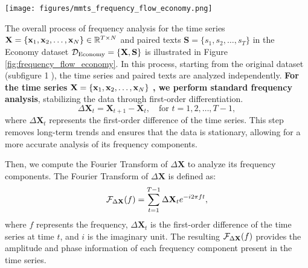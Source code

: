 \begin{figure*}[t]
    \centering
    \texttt{[image: figures/mmts\_frequency\_flow\_economy.png]}
    \caption{Illustration of the frequency analysis process for time series with paired texts in the Economy dataset. Step \textcircled{1}: Compute the average text similarity for each lag $k$. Step \textcircled{2}: Stabilize the time series using first-order differentiation, apply Fourier Transform, and perform Non-Maximum Suppression (NMS) to obtain the amplitude spectrum. Step \textcircled{3}: Visualize the lag similarity of paired texts. Step \textcircled{4}: Stabilize the paired texts, compute the Fourier Transform, and visualize the amplitude spectrum. Step \textcircled{5}: Overlay the top-$l$ (here $l$=4) frequencies of paired texts onto the time series amplitude spectrum to highlight shared periodic patterns. All the data transformation operations in this process are periodicity-preserving according to Proposition \ref{proposition: lag similarity} and Proposition \ref{proposition: first-order differentiation}.}
    \label{fig:frequency_flow_economy}
\end{figure*}



The overall process of frequency analysis for the time series $\mathbf{X} = \{\mathbf{x}_1, \mathbf{x}_2, \dots, \mathbf{x}_N \} \in \mathbb{R}^{T \times N}$ and paired texts $\bm{S} = \{s_1, s_2, \dots, s_T\}$ in the Economy dataset $\mathcal{D}_{\text{Economy}} = \{\mathbf{X}, \mathbf{S}\}$ is illustrated in Figure \ref{fig:frequency_flow_economy}. In this process, starting from the original dataset (subfigure \textcircled{1}), the time series and paired texts are analyzed independently. \textbf{For the time series} $\mathbf{X} = \{\mathbf{x}_1, \mathbf{x}_2, \dots, \mathbf{x}_N \}$ \textbf{, we perform standard frequency analysis}, stabilizing the data through first-order differentiation.
\begin{equation}
\Delta \bm{X}_t = \bm{X}_{t+1} - \bm{X}_t, \quad \text{for } t = 1, 2, \dots, T-1,
\end{equation}
where $\Delta \bm{X}_t$ represents the first-order difference of the time series. This step removes long-term trends and ensures that the data is stationary, allowing for a more accurate analysis of its frequency components.

Then, we compute the Fourier Transform \cite{nussbaumer1982fast, sneddon1995fourier} of $\Delta\bm{X}$ to analyze its frequency components. The Fourier Transform of $\Delta\bm{X}$ is defined as:
\begin{equation}
\mathcal{F}_{\Delta\mathbf{X}}(f) = \sum_{t=1}^{T-1} \Delta\mathbf{X}_t e^{-i 2 \pi f t},
\end{equation}
where $f$ represents the frequency, $\Delta\bm{X}_t$ is the first-order difference of the time series at time $t$, and $i$ is the imaginary unit. The resulting $\mathcal{F}_{\Delta\mathbf{X}}(f)$ provides the amplitude and phase information of each frequency component present in the time series.


